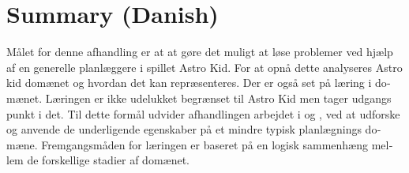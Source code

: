 \chapter{Summary (Danish)}
\begin{otherlanguage}{danish}
Målet for denne afhandling er at at gøre det muligt at løse problemer ved hjælp af en generelle planlæggere i spillet Astro Kid. For at opnå dette analyseres Astro kid domænet og hvordan det kan repræsenteres. Der er også set på læring i domænet. Læringen er ikke udelukket begrænset til Astro Kid men tager udgangs punkt i det. Til dette formål udvider afhandlingen arbejdet i \cite{Action-Schemas} og \cite{jacobsen2015a}, ved at udforske og anvende de underligende egenskaber på et mindre typisk planlægnings domæne. Fremgangsmåden for læringen er baseret på en logisk sammenhæng mellem de forskellige stadier af domænet. 

\end{otherlanguage}
